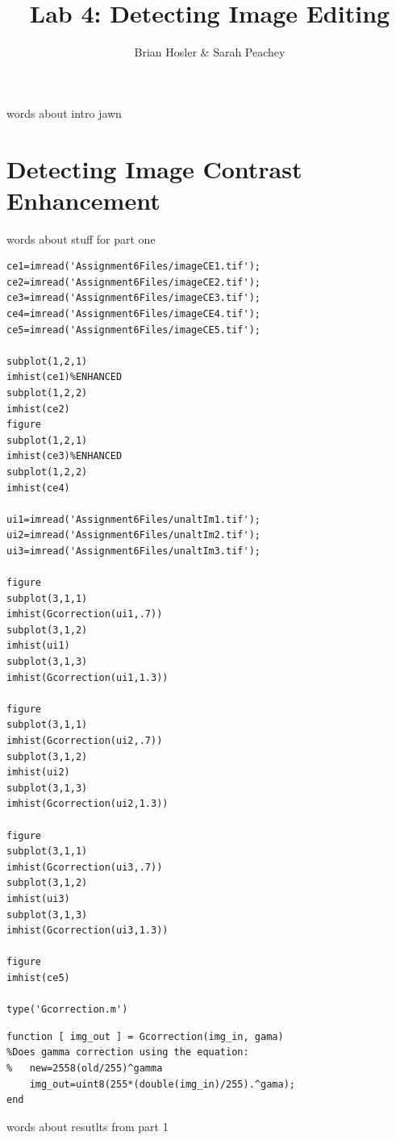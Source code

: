 \documentclass{article}
\begin{document}
\title{Lab 4: Detecting Image Editing}
\author{Brian Hosler \& Sarah Peachey }
\maketitle

\qquad words about intro jawn 

\newpage



\section{Detecting Image Contrast Enhancement}

\qquad words about stuff for part one 

\begin{verbatim}
ce1=imread('Assignment6Files/imageCE1.tif');
ce2=imread('Assignment6Files/imageCE2.tif');
ce3=imread('Assignment6Files/imageCE3.tif');
ce4=imread('Assignment6Files/imageCE4.tif');
ce5=imread('Assignment6Files/imageCE5.tif');

subplot(1,2,1)
imhist(ce1)%ENHANCED
subplot(1,2,2)
imhist(ce2)
figure
subplot(1,2,1)
imhist(ce3)%ENHANCED
subplot(1,2,2)
imhist(ce4)

ui1=imread('Assignment6Files/unaltIm1.tif');
ui2=imread('Assignment6Files/unaltIm2.tif');
ui3=imread('Assignment6Files/unaltIm3.tif');

figure
subplot(3,1,1)
imhist(Gcorrection(ui1,.7))
subplot(3,1,2)
imhist(ui1)
subplot(3,1,3)
imhist(Gcorrection(ui1,1.3))

figure
subplot(3,1,1)
imhist(Gcorrection(ui2,.7))
subplot(3,1,2)
imhist(ui2)
subplot(3,1,3)
imhist(Gcorrection(ui2,1.3))

figure
subplot(3,1,1)
imhist(Gcorrection(ui3,.7))
subplot(3,1,2)
imhist(ui3)
subplot(3,1,3)
imhist(Gcorrection(ui3,1.3))

figure
imhist(ce5)

type('Gcorrection.m')
\end{verbatim}

\color{lightgray} \begin{verbatim}
function [ img_out ] = Gcorrection(img_in, gama)
%Does gamma correction using the equation:
%   new=2558(old/255)^gamma
    img_out=uint8(255*(double(img_in)/255).^gama);
end

\end{verbatim} \color{black}
    
words about resutlts from part 1 
\end{document}
